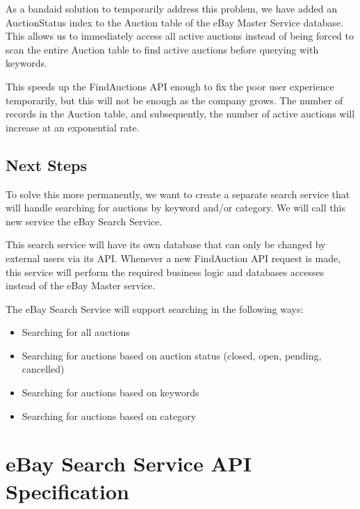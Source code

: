 \documentclass[12pt,a4paper]{article}
\begin{document}
As a bandaid solution to temporarily address this problem, we have added an 
AuctionStatus index to the Auction table of the eBay Master Service database.
This allows us to immediately access all active auctions instead of being forced 
to scan the entire Auction table to find active auctions before querying with keywords. 

\vspace{\baselineskip}
This speeds up the FindAuctions API enough to fix the poor user experience
temporarily, but this will not be enough as the company grows. The number of
records in the Auction table, and subsequently, the number of active auctions
will increase at an exponential rate.

\subsection{Next Steps}
To solve this more permanently, we want to create a separate search service
that will handle searching for auctions by keyword and/or category. 
We will call this new service the eBay Search Service.

\vspace{\baselineskip}
This search service will have its own database that can only be changed
by external users via its API. Whenever a new FindAuction API request is made, 
this service will perform the required business logic and databases accesses 
instead of the eBay Master service.

The eBay Search Service  will support searching in the following ways:

\begin{itemize}
\item Searching for all auctions
\item Searching for auctions based on auction status (closed, open, pending, cancelled)
\item Searching for auctions based on keywords
\item Searching for auctions based on category
\end{itemize}

\pagebreak

 
\section{eBay Search Service API Specification}
\end{document}
